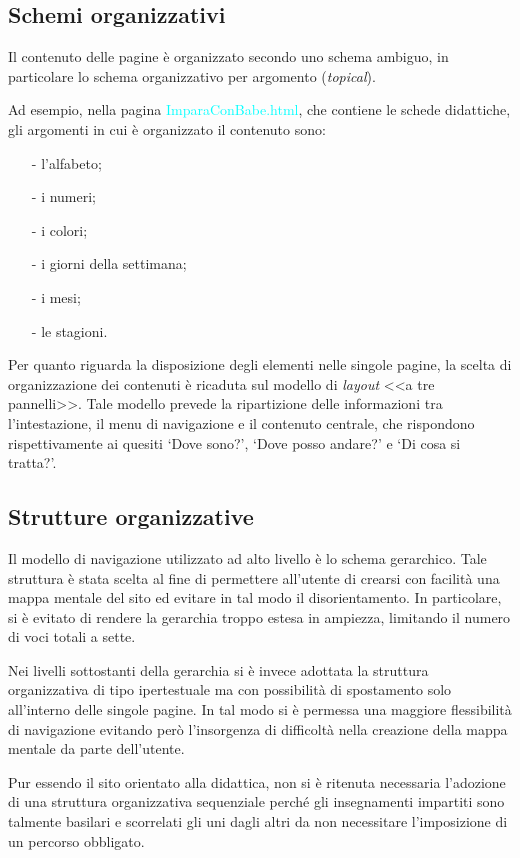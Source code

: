 \documentclass[10pt,a4paper,onecolumn]{article}
\newcommand{\sitepage}[1]{\textcolor{cyan}{\textsf{#1}}}
\newcommand{\inglese}[1]{\foreignlanguage{english}{\itshape{}#1}}
\begin{document}
\subsection{Schemi organizzativi}
Il contenuto delle pagine è organizzato secondo uno schema ambiguo, in particolare lo schema organizzativo per argomento (\inglese{topical}).

Ad esempio, nella pagina \sitepage{ImparaConBabe.html}, che contiene le schede didattiche, gli argomenti in cui è organizzato il contenuto sono:
\begin{itemize}[noitemsep,nolistsep]
  \item[-] l'alfabeto;
  \item[-] i numeri;
  \item[-] i colori;
  \item[-] i giorni della settimana;
  \item[-] i mesi;
  \item[-] le stagioni.
\end{itemize}

Per quanto riguarda la disposizione degli elementi nelle singole pagine, la scelta di organizzazione dei contenuti è ricaduta sul modello di \inglese{layout} <<a tre pannelli>>. Tale modello prevede la ripartizione delle informazioni tra l'intestazione, il menu di navigazione e il contenuto centrale, che rispondono rispettivamente ai quesiti `Dove sono?', `Dove posso andare?' e `Di cosa si tratta?'.

\subsection{Strutture organizzative}
Il modello di navigazione utilizzato ad alto livello è lo schema gerarchico. Tale struttura è stata scelta al fine di permettere all'utente di crearsi con facilità una mappa mentale del sito ed evitare in tal modo il disorientamento. In particolare, si è evitato di rendere la gerarchia troppo estesa in ampiezza, limitando il numero di voci totali a sette.

Nei livelli sottostanti della gerarchia si è invece adottata la struttura organizzativa di tipo ipertestuale ma con possibilità di spostamento solo all'interno delle singole pagine. In tal modo si è permessa una maggiore flessibilità di navigazione evitando però l'insorgenza di difficoltà nella creazione della mappa mentale da parte dell'utente.

Pur essendo il sito orientato alla didattica, non si è ritenuta necessaria l'adozione di una struttura organizzativa sequenziale perché gli insegnamenti impartiti sono talmente basilari e scorrelati gli uni dagli altri da non necessitare l'imposizione di un percorso obbligato.
\end{document}
